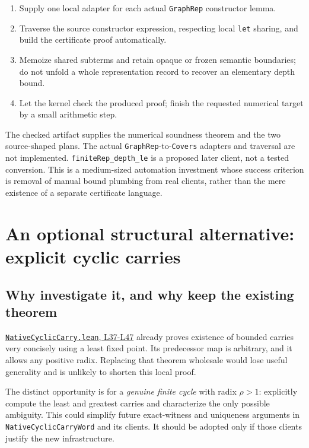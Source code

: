 \documentclass[11pt]{article}
\theoremstyle{remark}\newtheorem{remark}[theorem]{Remark}
\newcommand{\code}[1]{\nolinkurl{#1}}
\newcommand{\sref}[2]{\href{https://github.com/VladimirReshetnikov/ProveIt/blob/8e8b5dcb954969621c484588f0b902be1cfea7b3/Computability/DiophantineConsistency/Lean/DiophantineConsistency/#1\##2}{\nolinkurl{#1}, #2}}
\begin{document}
\begin{enumerate}
\item Supply one local adapter for each actual \code{GraphRep} constructor lemma.
\item Traverse the source constructor expression, respecting local \code{let} sharing, and build the certificate proof automatically.
\item Memoize shared subterms and retain opaque or frozen semantic boundaries; do not unfold a whole representation record to recover an elementary depth bound.
\item Let the kernel check the produced proof; finish the requested numerical target by a small arithmetic step.
\end{enumerate}

The checked artifact supplies the numerical soundness theorem and the two source-shaped plans. The actual \code{GraphRep}-to-\code{Covers} adapters and traversal are not implemented. \code{finiteRep_depth_le} is a proposed later client, not a tested conversion. This is a medium-sized automation investment whose success criterion is removal of manual bound plumbing from real clients, rather than the mere existence of a separate certificate language.

\section{An optional structural alternative: explicit cyclic carries}
\label{sec:carry}

\subsection{Why investigate it, and why keep the existing theorem}

\sref{NativeCyclicCarry.lean}{L37-L47} already proves existence of bounded carries very concisely using a least fixed point. Its predecessor map is arbitrary, and it allows any positive radix. Replacing that theorem wholesale would lose useful generality and is unlikely to shorten this local proof.

The distinct opportunity is for a \emph{genuine finite cycle} with radix \(\rho>1\): explicitly compute the least and greatest carries and characterize the only possible ambiguity. This could simplify future exact-witness and uniqueness arguments in \code{NativeCyclicCarryWord} and its clients. It should be adopted only if those clients justify the new infrastructure.
\end{document}
